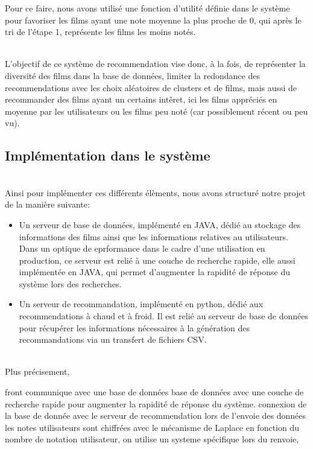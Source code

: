 \documentclass{article}
\begin{document}
\begin{itemize}
\begin{enumerate}
                    Pour ce faire, nous avons utilisé une fonction d'utilité définie dans le système pour favoriser les films ayant une note moyenne la plus proche de 0, qui après le tri de l'étape 1, représente les films les moins notés.
          \end{enumerate}
          $ $\\
          L'objectif de ce système de recommendation vise donc, à la fois, de représenter la diversité des films dans la base de données, limiter la redondance des recommendations avec les choix aléatoires de clusters et de films, mais aussi de recommander des films
          ayant un certains intêret, ici les films appréciés en moyenne par les utilisateurs ou les films peu noté (car possiblement récent ou peu vu).\\

\end{itemize}


\subsection{Implémentation dans le système}
$ $\\
Ainsi pour implémenter ces différents élèments, nous avons structuré notre projet de la manière suivante:\\
\begin{itemize}
    \item Un serveur de base de données, implémenté en JAVA, dédié au stockage des informations des films ainsi que les informations relatives au utilisateurs.
          Dans un optique de eprformance dans le cadre d'une utilisation en production, ce serveur est relié à une couche de recherche rapide, elle aussi implémentée en JAVA,
          qui permet d'augmenter la rapidité de réponse du système lors des recherches.
    \item Un serveur de recommandation, implémenté en python, dédié aux recommendations à chaud et à froid. Il est relié au serveur de base de données pour récupérer les
          informations nécessaires à la génération des recommandations via un transfert de fichiers CSV.
\end{itemize}
$ $\\
Plus précisement,



front communique avec une base de données
base de données avec une couche de recherche rapide pour augmenter la rapidité de réponse du système.
connexion de la base de donnée avec le serveur de recommendation
lors de l'envoie des données les notes utilisateurs sont chiffrées avec le mécanisme de Laplace
en fonction du nombre de notation utilisateur, on utilise un systeme spécifique
lors du renvoie,
\end{document}
